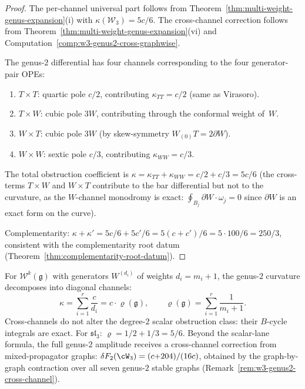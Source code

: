 \begin{proof}
The per-channel universal part follows from
Theorem~\ref{thm:multi-weight-genus-expansion}(i) with
$\kappa(\mathcal{W}_3) = 5c/6$.
The cross-channel correction follows from
Theorem~\ref{thm:multi-weight-genus-expansion}(vi)
and Computation~\ref{comp:w3-genus2-cross-graphwise}.

The genus-$2$ differential has four channels corresponding to
the four generator-pair OPEs:
\begin{enumerate}[label=\textup{(\roman*)}]
\item $T \times T$: quartic pole $c/2$, contributing
 $\kappa_{TT} = c/2$ (same as Virasoro).
\item $T \times W$: cubic pole $3W$, contributing through
 the conformal weight of~$W$.
\item $W \times T$: cubic pole $3W$ (by skew-symmetry
 $W_{(0)}T = 2\partial W$).
\item $W \times W$: sextic pole $c/3$, contributing
 $\kappa_{WW} = c/3$.
\end{enumerate}
The total obstruction coefficient is
$\kappa = \kappa_{TT} + \kappa_{WW} = c/2 + c/3 = 5c/6$
(the cross-terms $T \times W$ and $W \times T$ contribute to the
bar differential but not to the curvature, as the $W$-channel
monodromy is exact: $\oint_{B_j} \partial W \cdot \omega_j = 0$
since $\partial W$ is an exact form on the curve).

Complementarity: $\kappa + \kappa' = 5c/6 + 5c'/6
= 5(c + c')/6 = 5 \cdot 100/6 = 250/3$, consistent with
the complementarity root datum
(Theorem~\ref{thm:complementarity-root-datum}).
\end{proof}

\begin{remark}
\label{rem:w3-genus2-channels}
For $\mathcal{W}^k(\mathfrak{g})$ with generators $W^{(d_i)}$ of weights $d_i = m_i + 1$, the genus-$2$ curvature decomposes into diagonal channels:
\begin{equation}\label{eq:w-genus2-channel-decomp}
\kappa = \sum_{i=1}^{r} \frac{c}{d_i}
= c \cdot \varrho(\mathfrak{g}), \qquad
\varrho(\mathfrak{g}) = \sum_{i=1}^{r} \frac{1}{m_i + 1}.
\end{equation}
Cross-channels do not alter the degree-$2$ scalar obstruction class:
their $B$-cycle integrals are exact. For $\mathfrak{sl}_3$:
$\varrho = 1/2 + 1/3 = 5/6$. Beyond the scalar-lane formula,
the full genus-$2$ amplitude receives a cross-channel correction
from mixed-propagator graphs:
$\delta F_2(\cW_3) = (c{+}204)/(16c)$, obtained by the
graph-by-graph contraction over all seven genus-$2$ stable graphs
(Remark~\ref{rem:w3-genus2-cross-channel}).
\end{remark}

